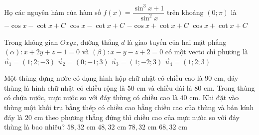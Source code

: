 \begin{ex}%
	Họ các nguyên hàm của hàm số $ f(x)=\dfrac{\sin^3x+1}{\sin^2x}$ trên khoảng $\left(0;\pi\right)$ là
	\choice
	{\True $-\cos x-\cot x+C$}
	{$\cos x-\cot x+C$}
	{$-\cos x+\cot x+C$}
	{$\cos x+\cot x+C$}
\end{ex}

\begin{ex}%
	Trong không gian $ Oxyz$, đường thẳng $d$ là giao tuyến của hai mặt phẳng $\left(\alpha\right)\colon x+2y+z-1=0$ và $\left(\beta\right)\colon x-y-z+2=0$ có một vectơ chỉ phương là
	\choice
	{$\vec u_1=\left(1;2;-3\right)$}
	{$\vec u_2=\left(0;-1;3\right)$}
	{\True $\vec u_3=\left(1;-2;3\right)$}
	{$\vec u_4=\left(1;2;3\right)$}
\end{ex}
%
\begin{ex}%
	Một thùng đựng nước có dạng hình hộp chữ nhật có chiều cao là $90$ cm, đáy thùng là hình chữ nhật có chiều rộng là $50$ cm và chiều dài là $80$ cm. Trong thùng có chứa nước, mực nước so với đáy thùng có chiều cao là $40$ cm. Khi đặt vào thùng một khối trụ bằng thép có chiều cao bằng chiều cao của thùng và bán kính đáy là $20$ cm theo phương thẳng đứng thì chiều cao của mực nước so với đáy thùng là bao nhiêu?
	\choice
	{\True $58{,}32$ cm}
	{$48{,}32$ cm}
	{$78{,}32$ cm}
	{$68{,}32$ cm}
\end{ex}
